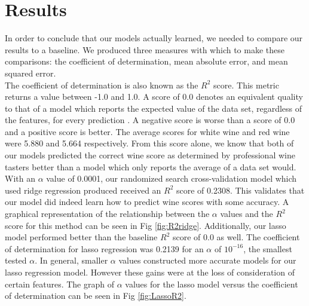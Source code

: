 

\section{Results}
\label{sec:results}

In order to conclude that our models actually learned, we needed to compare
our results to a baseline. We produced three measures with which to make
these comparisons: the coefficient of determination, mean absolute error, 
and mean squared error. \\

The coefficient of determination is also known as the $R^2$ score. This metric
returns a value between -1.0 and 1.0. A score of 0.0 denotes an equivalent
quality to that of a model which reports the expected value of the data set, 
regardless of the features, for every prediction \cite{scikit}. A negative score
is worse than a score of 0.0 and a positive score is better. The average scores
for white wine and red wine were 5.880 and 5.664 respectively. From this score
alone, we know that both of our models predicted the correct wine score
as determined by professional wine tasters better than a model
which only reports the average of a data set would. \\

With an $\alpha$ value of 0.0001, our randomized search cross-validation 
model which used ridge regression produced received an 
$R^2$ score of 0.2308. This validates that our model 
did indeed learn how to predict wine scores with some accuracy. A graphical
representation of the relationship between the $\alpha$ values and the $R^2$ score
for this method can be seen in Fig \ref{fig:R2ridge}. Additionally, our lasso model
performed better than the baseline $R^2$ score of 0.0 as well. The coefficient of
determination for lasso regression was 0.2139 for an $\alpha$ of $10^{-16}$, the smallest tested
$\alpha$. In general, smaller $\alpha$ values constructed more accurate models for
our lasso regression model. However these gains were at the loss of consideration
of certain features. The graph of $\alpha$ values for the lasso model versus the
coefficient of determination can be seen in Fig \ref{fig:LassoR2}.\\

